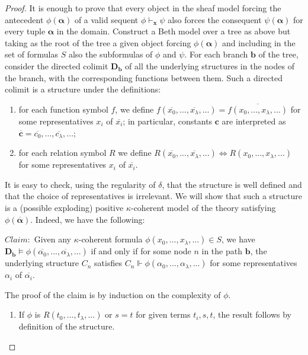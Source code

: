 \documentclass[a4paper,11pt]{article}
\theoremstyle{plain}
\theoremstyle{plain}
\theoremstyle{remark}
\begin{document}
\begin{proof}
 It is enough to prove that every object in the sheaf model forcing the antecedent $\phi(\boldsymbol{\alpha})$ of a valid sequent $\phi \vdash_{\mathbf{x}} \psi$ also forces the consequent $\psi(\boldsymbol{\alpha})$ for every tuple $\boldsymbol{\alpha}$ in the domain. Construct a Beth model over a tree as above but taking as the root of the tree a given object forcing $\phi(\boldsymbol{\alpha})$ and including in the set of formulas $S$ also the subformulas of $\phi$ and $\psi$. For each branch $\mathbf{b}$ of the tree, consider the directed colimit $\mathbf{D_b}$ of all the underlying structures in the nodes of the branch, with the corresponding functions between them. Such a directed colimit is a structure under the definitions:
 
 \begin{enumerate}
 \item for each function symbol $f$, we define $f(\overline{x_0}, ..., \overline{x_{\lambda}}, ...)=\overline{f(x_0, ..., x_{\lambda}, ...)}$ for some representatives $x_i$ of $\overline{x_i}$; in particular, constants $\mathbf{c}$ are interpreted as $\overline{\mathbf{c}}=\overline{c_0}, ..., \overline{c_{\lambda}}, ...$;
 \item for each relation symbol $R$ we define $R(\overline{x_0}, ..., \overline{x_{\lambda}}, ...) \iff R(x_0, ..., x_{\lambda}, ...)$ for some representatives $x_i$ of $\overline{x_i}$.
 \end{enumerate} 
 
  It is easy to check, using the regularity of $\delta$, that the structure is well defined and that the choice of representatives is irrelevant. We will show that such a structure is a (possible exploding) positive $\kappa$-coherent model of the theory satisfying $\phi(\overline{\boldsymbol{\alpha}})$. Indeed, we have the following:
 
 $Claim:$ Given any $\kappa$-coherent formula $\phi(x_0, ..., x_{\lambda}, ...) \in S$, we have $\mathbf{D_b} \vDash \phi(\overline{\alpha_0}, ..., \overline{\alpha_{\lambda}}, ...)$ if and only if for some node $n$ in the path $\mathbf{b}$, the underlying structure $C_n$ satisfies $C_n \Vdash \phi(\alpha_0, ..., \alpha_{\lambda}, ...)$ for some representatives $\alpha_i$ of $\overline{\alpha_i}$.
 
 The proof of the claim is by induction on the complexity of $\phi$. 
 
 \begin{enumerate}
  \item If $\phi$ is $R(t_0, ..., t_{\lambda}, ...)$ or $s=t$ for given terms $t_i, s, t$, the result follows by definition of the structure. 
  

\end{enumerate}
\end{proof}
\end{document}
